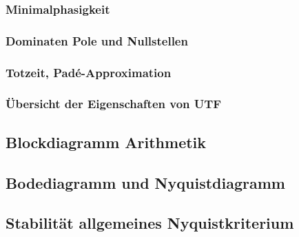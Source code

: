 \subsubsection{Minimalphasigkeit}

\subsubsection{Dominaten Pole und Nullstellen}

\subsubsection{Totzeit, Padé-Approximation}

\subsubsection{Übersicht der Eigenschaften von UTF}

\subsection{Blockdiagramm Arithmetik}

\subsection{Bodediagramm und Nyquistdiagramm}

\subsection{Stabilität allgemeines Nyquistkriterium}


\newpage